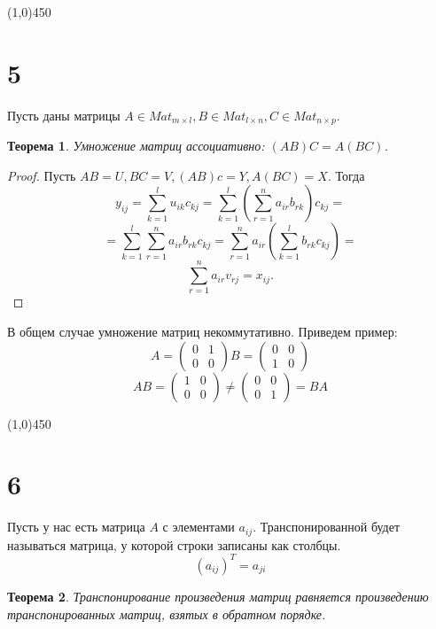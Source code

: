 \documentclass[a4paper,12pt]{article}
\newtheorem*{ther}{Теорема}
\begin{document}
	
	\begin{center}
		\line(1,0){450}
	\end{center}

	
	\section*{5}
	Пусть даны матрицы $A \in Mat_{m \times l}, B \in Mat_{l \times n}, C \in Mat_{n \times p}$. 
	\begin{ther}
		Умножение матриц ассоциативно: $(AB)C = A(BC)$.
	\end{ther}
	\begin{proof}
		Пусть $AB = U, BC = V,(AB)c = Y, A(BC) = X$. Тогда
		\[
		y_{ij} = 
		\sum_{k = 1}^{l} u_{ik}c_{kj} = 
		\sum_{k = 1}^{l} \left( \sum_{r = 1}^{n} a_{ir}b_{rk}\right)c_{kj} =
		\]
		\[
		=
		\sum_{k = 1}^{l}\sum_{r = 1}^{n} a_{ir}b_{rk}c_{kj} = 
		\sum_{r = 1}^{n} a_{ir} \left(\sum_{k = 1}^{l}b_{rk}c_{kj}\right) = 
		\]
		\[
		\sum_{r = 1}^{n} a_{ir}v_{rj} = x_{ij}.
		\]
	\end{proof}
	
	В общем случае умножение матриц некоммутативно. Приведем пример:
	\[
	A = \begin{pmatrix}
	0 & 1 \\
	0 & 0
	\end{pmatrix}
	B = \begin{pmatrix}
	0 & 0\\
	1 & 0 
	\end{pmatrix}
	\]
	\[
	AB = \begin{pmatrix}
	1 & 0 \\
	0 & 0
	\end{pmatrix}
	\neq
	\begin{pmatrix}
	0 & 0 \\
	0 & 1
	\end{pmatrix}
	= BA
	\]
	
	\begin{center}
		\line(1,0){450}
	\end{center}
	
	\section*{6}
	Пусть у нас есть матрица $A$ с элементами $a_{ij}$. Транспонированной будет называться матрица, у которой строки записаны как столбцы.
	\[
	(a_{ij})^T = a_{ji}
	\]
	
	\begin{ther}
		Транспонирование произведения матриц равняется произведению транспонированных матриц, взятых в обратном порядке.
	\end{ther}
	
\end{document}
